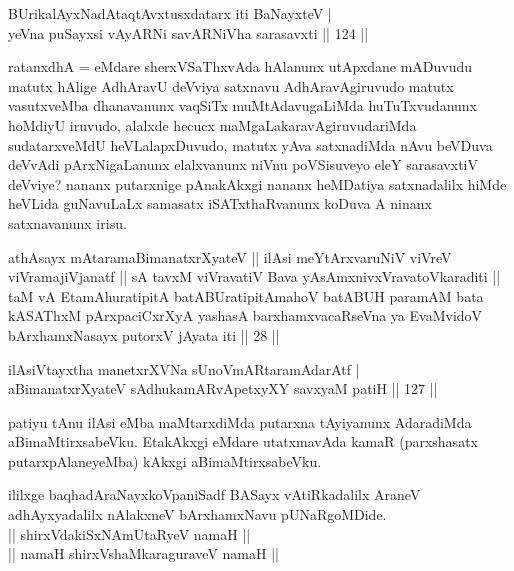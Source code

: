 \begin{shl}
BUrikalAyxNadAtaqtAvxtusxdatarx iti BaNayxteV | \\
yeVna puSayxsi vAyARNi savARNiVha sarasavxti \hfill|| 124 || 
\end{shl}

\begin{artha}
ratanxdhA = eMdare sherxVSaThxvAda hAlanunx utApxdane mADuvudu matutx hAlige AdhAravU deVviya satxnavu AdhAravAgiruvudo matutx vasutxveMba dhanavanunx vaqSiTx muMtAdavugaLiMda huTuTxvudanunx hoMdiyU iruvudo, alalxde hecucx maMgaLakaravAgiruvudariMda sudatarxveMdU heVLalapxDuvudo, matutx yAva satxnadiMda nAvu beVDuva deVvAdi pArxNigaLanunx elalxvanunx niVnu poVSisuveyo eleY sarasavxtiV deVviye? nananx putarxnige pAnakAkxgi nananx heMDatiya satxnadalilx hiMde heVLida guNavuLaLx samasatx iSATxthaRvanunx koDuva A ninanx satxnavanunx irisu.
\end{artha}

\begin{shl}
\footnotemark[1]athAsayx mAtaramaBimanatxrXyateV || ilAsi meYtArxvaruNiV viVreV viVramajiVjanatf || sA tavxM viVravatiV Bava yAsAmxnivxVravatoV\s karaditi || taM vA EtamAhuratipitA batABUratipitAmahoV batABUH paramAM bata kASAThxM pArxpaciCxrXyA yashasA barxhamxvacaRseVna ya EvaMvidoV bArxhamxNasayx putorxV jAyata iti || 28 ||
\end{shl}

\begin{shl}
ilA\s siVtayxtha manetxrXVNa sUnoVmARtaramAdarAtf | \\
aBimanatxrXyateV sAdhukamARvApetxyXY savxyaM patiH \hfill|| 127 || 
\end{shl}

\begin{artha}
patiyu tAnu ilAsi eMba maMtarxdiMda putarxna tAyiyanunx AdaradiMda 
aBimaMtirxsabeVku. EtakAkxgi eMdare utatxmavAda kamaR (parxshasatx 
putarxpAlaneyeMba) kAkxgi aBimaMtirxsabeVku.
\end{artha}

\begin{center}
ililxge baqhadAraNayxkoVpaniSadf BASayx vAtiRkadalilx AraneV 
adhAyxyadalilx nAlakxneV bArxhamxNavu pUNaRgoMDide.\\
|| shirxVdakiSxNAmUtaRyeV namaH ||\\
|| namaH shirxVshaMkaraguraveV namaH ||
\end{center}
